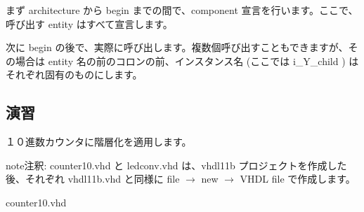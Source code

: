 \documentclass[letterpaper,10pt,dvipdfmx]{sphinxmanual}
\begin{document}
まず architecture から begin までの間で、component 宣言を行います。ここで、呼び出す entity はすべて宣言します。

次に begin の後で、実際に呼び出します。複数個呼び出すこともできますが、その場合は entity 名の前のコロンの前、インスタンス名 (ここでは i\_Y\_child ) はそれぞれ固有のものにします。


\subsection{演習}
\label{\detokenize{05_try:id25}}
１０進数カウンタに階層化を適用します。

\begin{sphinxadmonition}{note}{注釈:}
counter10.vhd と ledconv.vhd は、vhdl11b プロジェクトを作成した後、それぞれ vhdl11b.vhd と同様に file \(\rightarrow\) new \(\rightarrow\) VHDL file で作成します。
\end{sphinxadmonition}

counter10.vhd
\end{document}
